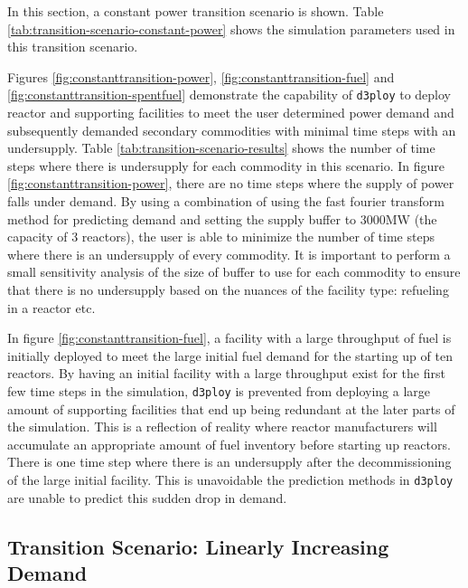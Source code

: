 \documentclass{anstrans}
\newcommand{\deploy}{\texttt{d3ploy}\xspace}%
\begin{document}
In this section, a constant power transition scenario is shown. 
Table \ref{tab:transition-scenario-constant-power} shows the 
simulation parameters used in this transition scenario. 

Figures \ref{fig:constanttransition-power}, \ref{fig:constanttransition-fuel}
and \ref{fig:constanttransition-spentfuel} demonstrate the capability 
of \deploy to deploy reactor and supporting facilities to meet the user 
determined power demand and subsequently demanded secondary commodities 
with minimal time steps with an undersupply. 
Table \ref{tab:transition-scenario-results} shows the number of time 
steps where there is undersupply for each commodity in this scenario. 
In figure \ref{fig:constanttransition-power}, there are no time steps
where the supply of power falls under demand.
By using a combination of using the fast fourier transform method for predicting 
demand and setting the supply buffer to 3000MW (the capacity of 3 reactors), 
the user is able to minimize the number of time steps where there 
is an undersupply of every commodity. 
It is important to perform a small sensitivity analysis of the size 
of buffer to use for each commodity to ensure that there is no 
undersupply based on the nuances of the facility type: 
refueling in a reactor etc. 

In figure \ref{fig:constanttransition-fuel},
a facility with a large throughput of fuel is initially
deployed to meet the large initial fuel demand for the starting
up of ten reactors. 
By having an initial facility with a large throughput
exist for the first few time steps in the simulation,
\deploy is prevented from deploying a large amount of supporting
facilities that end up being redundant at the later parts of 
the simulation.   
This is a reflection of reality where reactor manufacturers will 
accumulate an appropriate amount of fuel inventory before starting 
up reactors. 
There is one time step where there is an undersupply after the 
decommissioning of the large initial facility.  
This is unavoidable the prediction methods in \deploy are unable 
to predict this sudden drop in demand. 


\subsection{\textbf{Transition Scenario: Linearly Increasing Demand}}
\end{document}
